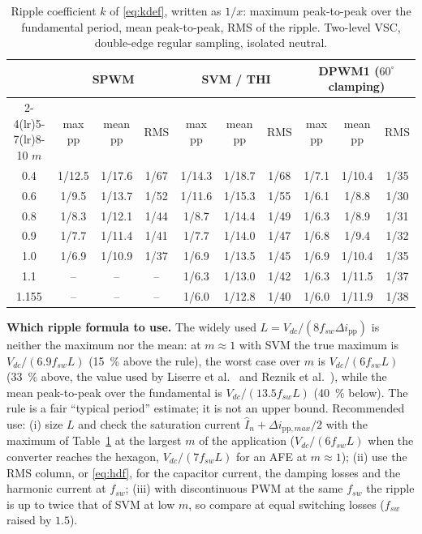\documentclass[10pt,a4paper]{scrartcl}
\newcommand{\Vdc}{V_{dc}}
\newcommand{\fsw}{f_{sw}}
\newcommand{\pp}{\mathrm{pp}}
\begin{document}
\begin{onehalfspace}
\begin{table}[htb]
\centering\small\begin{onehalfspace}
\caption{Ripple coefficient $k$ of \eqref{eq:kdef}, written as $1/x$: maximum peak-to-peak over the fundamental period, mean peak-to-peak, RMS of the ripple. Two-level VSC, double-edge regular sampling, isolated neutral.}
\label{tab:ripple}
\begin{tabular}{@{}c ccc ccc ccc@{}}
\toprule
 & \multicolumn{3}{c}{SPWM} & \multicolumn{3}{c}{SVM / THI} & \multicolumn{3}{c}{DPWM1 ($60^\circ$ clamping)} \\
\cmidrule(lr){2-4}\cmidrule(lr){5-7}\cmidrule(lr){8-10}
$m$ & max pp & mean pp & RMS & max pp & mean pp & RMS & max pp & mean pp & RMS \\
\midrule
0.4   & 1/12.5 & 1/17.6 & 1/67 & 1/14.3 & 1/18.7 & 1/68 & 1/7.1 & 1/10.4 & 1/35 \\
0.6   & 1/9.5  & 1/13.7 & 1/52 & 1/11.6 & 1/15.3 & 1/55 & 1/6.1 & 1/8.8  & 1/30 \\
0.8   & 1/8.3  & 1/12.1 & 1/44 & 1/8.7  & 1/14.4 & 1/49 & 1/6.3 & 1/8.9  & 1/31 \\
0.9   & 1/7.7  & 1/11.4 & 1/41 & 1/7.7  & 1/14.0 & 1/47 & 1/6.8 & 1/9.4  & 1/32 \\
1.0   & 1/6.9  & 1/10.9 & 1/37 & 1/6.9  & 1/13.5 & 1/45 & 1/6.9 & 1/10.4 & 1/35 \\
1.1   & --     & --     & --   & 1/6.3  & 1/13.0 & 1/42 & 1/6.3 & 1/11.5 & 1/37 \\
1.155 & --     & --     & --   & 1/6.0  & 1/12.8 & 1/40 & 1/6.0 & 1/11.9 & 1/38 \\
\bottomrule
\end{tabular}
\end{onehalfspace}
\end{table}

\begin{mybox}
\textbf{Which ripple formula to use.} The widely used $L = \Vdc/(8\fsw\Delta i_{\pp})$ is neither the maximum nor the mean: at $m \approx 1$ with SVM the true maximum is $\Vdc/(6.9\fsw L)$ (\SI{15}{\percent} above the rule), the worst case over $m$ is $\Vdc/(6\fsw L)$ (\SI{33}{\percent} above, the value used by Liserre et al.~\cite{liserre2005} and Reznik et al.~\cite{reznik2014}), while the mean peak-to-peak over the fundamental is $\Vdc/(13.5\fsw L)$ (\SI{40}{\percent} below). The rule is a fair ``typical period'' estimate; it is not an upper bound. Recommended use: (i) size $L$ and check the saturation current $\hat I_n + \Delta i_{\pp,max}/2$ with the maximum of Table~\ref{tab:ripple} at the largest $m$ of the application ($\Vdc/(6\fsw L)$ when the converter reaches the hexagon, $\Vdc/(7\fsw L)$ for an AFE at $m \approx 1$); (ii) use the RMS column, or \eqref{eq:hdf}, for the capacitor current, the damping losses and the harmonic current at $\fsw$; (iii) with discontinuous PWM at the same $\fsw$ the ripple is up to twice that of SVM at low $m$, so compare at equal switching losses ($\fsw$ raised by $1.5$).
\end{mybox}


\end{onehalfspace}
\end{document}
